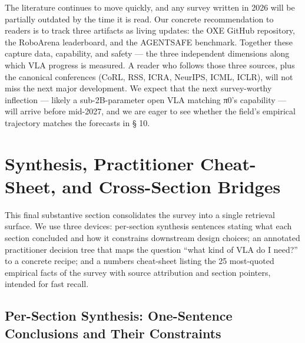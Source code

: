 The literature continues to move quickly, and any survey written in 2026 will be partially outdated by the time it is read. Our concrete recommendation to readers is to track three artifacts as living updates: the OXE GitHub repository, the RoboArena leaderboard, and the AGENTSAFE benchmark. Together these capture data, capability, and safety --- the three independent dimensions along which VLA progress is measured. A reader who follows those three sources, plus the canonical conferences (CoRL, RSS, ICRA, NeurIPS, ICML, ICLR), will not miss the next major development. We expect that the next survey-worthy inflection --- likely a sub-2B-parameter open VLA matching π0's capability --- will arrive before mid-2027, and we are eager to see whether the field's empirical trajectory matches the forecasts in § 10.

\section{Synthesis, Practitioner Cheat-Sheet, and Cross-Section Bridges}\label{synthesis-practitioner-cheat-sheet-and-cross-section-bridges}

This final substantive section consolidates the survey into a single retrieval surface. We use three devices: per-section synthesis sentences stating what each section concluded and how it constrains downstream design choices; an annotated practitioner decision tree that maps the question ``what kind of VLA do I need?'' to a concrete recipe; and a numbers cheat-sheet listing the 25 most-quoted empirical facts of the survey with source attribution and section pointers, intended for fast recall.

\subsection{Per-Section Synthesis: One-Sentence Conclusions and Their Constraints}\label{per-section-synthesis-one-sentence-conclusions-and-their-constraints}

